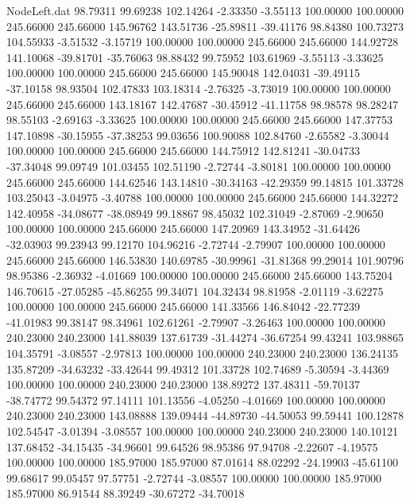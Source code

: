 \begin{filecontents}{NodeLeft.dat}
  98.79311   99.69238  102.14264    -2.33350   -3.55113  100.00000  100.00000  245.66000  245.66000  145.96762  143.51736  -25.89811  -39.41176
  98.84380  100.73273  104.55933    -3.51532   -3.15719  100.00000  100.00000  245.66000  245.66000  144.92728  141.10068  -39.81701  -35.76063
  98.88432   99.75952  103.61969    -3.55113   -3.33625  100.00000  100.00000  245.66000  245.66000  145.90048  142.04031  -39.49115  -37.10158
  98.93504  102.47833  103.18314    -2.76325   -3.73019  100.00000  100.00000  245.66000  245.66000  143.18167  142.47687  -30.45912  -41.11758
  98.98578   98.28247   98.55103    -2.69163   -3.33625  100.00000  100.00000  245.66000  245.66000  147.37753  147.10898  -30.15955  -37.38253
  99.03656  100.90088  102.84760    -2.65582   -3.30044  100.00000  100.00000  245.66000  245.66000  144.75912  142.81241  -30.04733  -37.34048
  99.09749  101.03455  102.51190    -2.72744   -3.80181  100.00000  100.00000  245.66000  245.66000  144.62546  143.14810  -30.34163  -42.29359
  99.14815  101.33728  103.25043    -3.04975   -3.40788  100.00000  100.00000  245.66000  245.66000  144.32272  142.40958  -34.08677  -38.08949
  99.18867   98.45032  102.31049    -2.87069   -2.90650  100.00000  100.00000  245.66000  245.66000  147.20969  143.34952  -31.64426  -32.03903
  99.23943   99.12170  104.96216    -2.72744   -2.79907  100.00000  100.00000  245.66000  245.66000  146.53830  140.69785  -30.99961  -31.81368
  99.29014  101.90796   98.95386    -2.36932   -4.01669  100.00000  100.00000  245.66000  245.66000  143.75204  146.70615  -27.05285  -45.86255
  99.34071  104.32434   98.81958    -2.01119   -3.62275  100.00000  100.00000  245.66000  245.66000  141.33566  146.84042  -22.77239  -41.01983
  99.38147   98.34961  102.61261    -2.79907   -3.26463  100.00000  100.00000  240.23000  240.23000  141.88039  137.61739  -31.44274  -36.67254
  99.43241  103.98865  104.35791    -3.08557   -2.97813  100.00000  100.00000  240.23000  240.23000  136.24135  135.87209  -34.63232  -33.42644
  99.49312  101.33728  102.74689    -5.30594   -3.44369  100.00000  100.00000  240.23000  240.23000  138.89272  137.48311  -59.70137  -38.74772
  99.54372   97.14111  101.13556    -4.05250   -4.01669  100.00000  100.00000  240.23000  240.23000  143.08888  139.09444  -44.89730  -44.50053
  99.59441  100.12878  102.54547    -3.01394   -3.08557  100.00000  100.00000  240.23000  240.23000  140.10121  137.68452  -34.15435  -34.96601
  99.64526   98.95386   97.94708    -2.22607   -4.19575  100.00000  100.00000  185.97000  185.97000   87.01614   88.02292  -24.19903  -45.61100
  99.68617   99.05457   97.57751    -2.72744   -3.08557  100.00000  100.00000  185.97000  185.97000   86.91544   88.39249  -30.67272  -34.70018

\end{filecontents}
